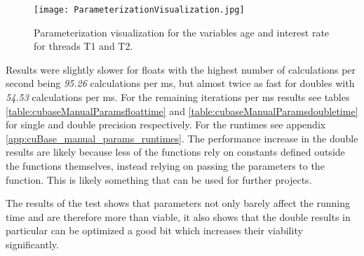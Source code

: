 \begin{figure}[h!]\centering
\texttt{[image: ParameterizationVisualization.jpg]}
\caption{Parameterization visualization for the variables age and interest rate for threads T1 and T2.\label{fig:ParameterizationVisualization}}
\end{figure}

Results were slightly slower for floats with the highest number of calculations per second being \emph{95.26} calculations per ms, but almost twice as fast for doubles with \emph{54.53} calculations per ms. 
For the remaining iterations per ms results see tables \ref{table:cubaseManualParamsfloattime} and \ref{table:cubaseManualParamsdoubletime} for single and double precision respectively.
For the runtimes see appendix \ref{app:cuBase_manual_params_runtimes}.
The performance increase in the double results are likely because less of the functions rely on constants defined outside the functions themselves, instead relying on passing the parameters to the function. %
This is likely something that can be used for further projects. %

The results of the test shows that parameters not only barely affect the running time and are therefore more than viable, it also shows that the double results in particular can be optimized a good bit which increases their viability significantly.

\begin{table}[h!]
\centering
{}
\caption{F\# Alea.cuBase calculations per ms with single precision and parameters\label{table:cubaseManualParamsfloattime}}
\end{table}

